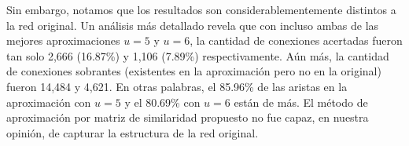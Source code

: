 Sin embargo, notamos que los resultados son considerablementemente distintos a la red original. Un análisis más detallado revela que con incluso ambas de las mejores aproximaciones $u = 5$ y $u = 6$, la cantidad de conexiones acertadas fueron tan solo 2,666 (16.87\%) y 1,106 (7.89\%) respectivamente. Aún más, la cantidad de conexiones sobrantes (existentes en la aproximación pero no en la original) fueron 14,484 y 4,621. En otras palabras, el 85.96\% de las aristas en la aproximación con $u = 5$ y el 80.69\% con $u = 6$ están de más. El método de aproximación por matriz de similaridad propuesto no fue capaz, en nuestra opinión, de capturar la estructura de la red original. 





